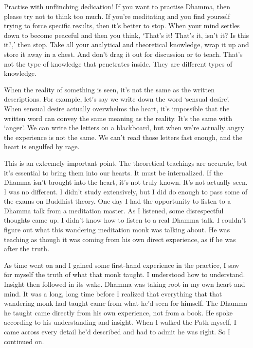 Practise with unflinching dedication! If you want to practise Dhamma, then please try not to think too much. If you're meditating and you find yourself trying to force specific results, then it's better to stop. When your mind settles down to become peaceful and then you think, `That's it! That's it, isn't it? Is this it?,' then stop. Take all your analytical and theoretical knowledge, wrap it up and store it away in a chest. And don't drag it out for discussion or to teach. That's not the type of knowledge that penetrates inside. They are different types of knowledge.

When the reality of something is seen, it's not the same as the written descriptions. For example, let's say we write down the word `sensual desire'. When sensual desire actually overwhelms the heart, it's impossible that the written word can convey the same meaning as the reality. It's the same with `anger'. We can write the letters on a blackboard, but when we're actually angry the experience is not the same. We can't read those letters fast enough, and the heart is engulfed by rage.

This is an extremely important point. The theoretical teachings are accurate, but it's essential to bring them into our hearts. It must be internalized. If the Dhamma isn't brought into the heart, it's not truly known. It's not actually seen. I was no different. I didn't study extensively, but I did do enough to pass some of the exams on Buddhist theory. One day I had the opportunity to listen to a Dhamma talk from a meditation master. As I listened, some disrespectful thoughts came up. I didn't know how to listen to a real Dhamma talk. I couldn't figure out what this wandering meditation monk was talking about. He was teaching as though it was coming from his own direct experience, as if he was after the truth.

As time went on and I gained some first-hand experience in the practice, I saw for myself the truth of what that monk taught. I understood how to understand. Insight then followed in its wake. Dhamma was taking root in my own heart and mind. It was a long, long time before I realized that everything that that wandering monk had taught came from what he'd seen for himself. The Dhamma he taught came directly from his own experience, not from a book. He spoke according to his understanding and insight. When I walked the Path myself, I came across every detail he'd described and had to admit he was right. So I continued on.

